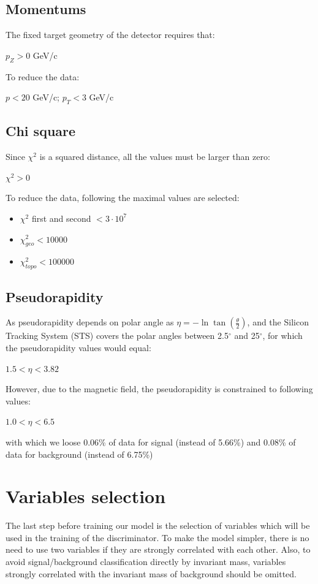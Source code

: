 \documentclass[12pt,a4paper]{report}
\begin{document}
\subsection{Momentums}
The fixed target geometry of the detector requires that:
\begin{center}
    $p_Z > 0 $ GeV/c
\end{center}
To reduce the data:
\begin{center}
    $p < 20$ GeV/c; $p_T < 3$ GeV/c
\end{center}


\subsection{Chi square}
Since $\chi^2$ is a squared distance, all the values must be larger than zero:
\begin{center}
    $\chi^2 > 0$
\end{center}
To reduce the data, following the maximal values are selected:
\begin{itemize}
    \item $\chi^2$ first and second $< 3 \cdot 10^7$
    \item $\chi^2_{geo} < 10000$
    \item $\chi^2_{topo} < 100000$
\end{itemize}



\subsection{Pseudorapidity}
As pseudorapidity depends on polar angle as $\eta = -\ln{\tan(\frac{\theta}{2})}$, and the Silicon Tracking System (STS) covers the polar angles between 2.5$^{\circ}$ and 25$^{\circ}$, for which the pseudorapidity values would equal:
\begin{center}
    $ 1.5< \eta < 3.82 $
\end{center}
However, due to the magnetic field, the pseudorapidity is constrained to following values:
\begin{center}
    $ 1.0< \eta < 6.5 $
\end{center}
with which we loose 0.06\% of data for signal (instead of 5.66\%) and 0.08\% of data for background (instead of 6.75\%)

\section{Variables selection}
The last step before training our model is the selection of variables which will be used in the training of the discriminator. To make the model simpler, there is no need to use two variables if they are strongly correlated with each other. Also, to avoid signal/background classification directly by invariant mass, variables strongly correlated with the invariant mass of background should be omitted.
\end{document}

